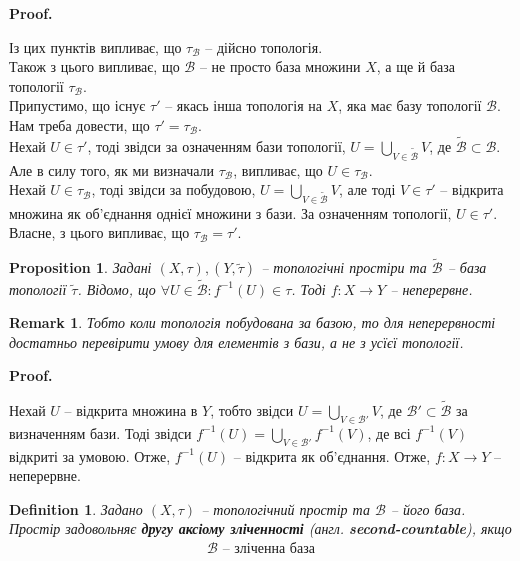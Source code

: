 \documentclass[a4paper, 10pt]{article}
\makeatletter
\theoremstyle{theoremdd}
\newtheorem{definition}[theorem]{Definition}
\newtheorem{proposition}[theorem]{Proposition}
\newtheorem{remark}[theorem]{Remark}
\renewenvironment{proof}[1][Proof.\\]{\par
\pushQED{\hfill \qed}%
\normalfont \topsep6\p@\@plus6\p@\relax
\trivlist
\item\relax
{\bfseries
#1\@addpunct{.}}\hspace\labelsep\ignorespaces
}{%
\popQED\endtrivlist\@endpefalse
}
\makeatother
\begin{document}
\begin{proof}
Із цих пунктів випливає, що $\tau_\mathcal{B}$ -- дійсно топологія.
\bigskip \\
Також з цього випливає, що $\mathcal{B}$ -- не просто база множини $X$, а ще й база топології $\tau_{\mathcal{B}}$.\\
Припустимо, що існує $\tau'$ -- якась інша топологія на $X$, яка має базу топології $\mathcal{B}$. Нам треба довести, що $\tau' = \tau_{\mathcal{B}}$.\\
Нехай $U \in \tau'$, тоді звідси за означенням бази топології, $U = \displaystyle\bigcup_{V \in \mathcal{\tilde{B}}} V$, де $\mathcal{\tilde{B}} \subset \mathcal{B}$. Але в силу того, як ми визначали $\tau_{\mathcal{B}}$, випливає, що $U \in \tau_{\mathcal{B}}$.\\
Нехай $U \in \tau_{\mathcal{B}}$, тоді звідси за побудовою, $U = \displaystyle\bigcup_{V \in \mathcal{\tilde{B}}} V$, але тоді $V \in \tau'$ -- відкрита множина як об'єднання однієї множини з бази. За означенням топології, $U \in \tau'$.\\
Власне, з цього випливає, що $\tau_{\mathcal{B}} = \tau'$.
\end{proof}

\begin{proposition}
Задані $(X,\tau), (Y,\tilde{\tau})$ -- топологічні простіри та $\tilde{\mathcal{B}}$ -- база топології $\tilde{\tau}$. Відомо, що $\forall U \in \tilde{\mathcal{B}}: f^{-1}(U) \in \tau$. Тоді $f \colon X \to Y$ -- неперервне.
\end{proposition}

\begin{remark}
Тобто коли топологія побудована за базою, то для неперервності достатньо перевірити умову для елементів з бази, а не з усїєї топології.
\end{remark}

\begin{proof}
Нехай $U$ -- відкрита множина в $Y$, тобто звідси $U = \displaystyle\bigcup_{V \in \mathcal{B}'} V$, де $\mathcal{B}' \subset \tilde{\mathcal{B}}$ за визначенням бази. Тоді звідси $f^{-1}(U) = \displaystyle\bigcup_{V \in \mathcal{B}'} f^{-1}(V)$, де всі $f^{-1}(V)$ відкриті за умовою. Отже, $f^{-1}(U)$ -- відкрита як об'єднання. Отже, $f \colon X \to Y$ -- неперервне.
\end{proof}

\begin{definition}
Задано $(X,\tau)$ -- топологічний простір та $\mathcal{B}$ -- його база.\\
Простір задовольняє \textbf{другу аксіому зліченності} (англ. \textbf{second-countable}), якщо
\begin{align*}
\mathcal{B} \text{ -- зліченна база}
\end{align*}
\end{definition}
\end{document}
